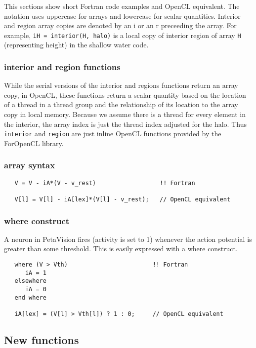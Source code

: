 This sections show short Fortran code examples and OpenCL equivalent.  The
notation uses uppercase for arrays and lowercase for scalar quantities.
Interior and region array copies are denoted by an i or an r preceeding the array.
For example, {\tt iH = interior(H, halo)} is a local copy of interior region
of array {\tt H} (representing height) in the shallow water code.

\subsubsection{interior and region functions}

While the serial versions of the interior and regions functions return an
array copy, in OpenCL, these functions return a scalar quantity based on
the location of a thread in a thread group and the relationship of its location
to the array copy in local memory.  Because we assume there is a thread for
every element in the interior, the array index is just the thread index adjusted
for the halo.  Thus {\tt interior} and {\tt region} are just inline OpenCL
functions provided by the ForOpenCL library.

\subsubsection{array syntax}



\begin{verbatim}
   V = V - iA*(V - v_rest)                  !! Fortran

   V[l] = V[l] - iA[lex]*(V[l] - v_rest);   // OpenCL equivalent
\end{verbatim}

\subsubsection{where construct}

A neuron in PetaVision fires (activity is set to 1)
whenever the action potential is greater than some threshold.
This is easily expressed with a where construct.

\begin{verbatim}
   where (V > Vth)                        !! Fortran
      iA = 1
   elsewhere
      iA = 0
   end where

   iA[lex] = (V[l] > Vth[l]) ? 1 : 0;     // OpenCL equivalent
\end{verbatim}

\subsection{New functions}

